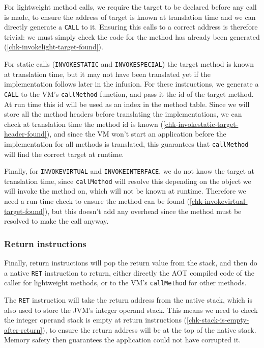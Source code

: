 For lightweight method calls, we require the target to be declared before any call is made, to ensure the address of target is known at translation time and we can directly generate a \texttt{CALL} to it. Ensuring this calls to a correct address is therefore trivial: we must simply check the code for the method has already been generated (\ref{chk-invokelight-target-found}).

For static calls (\texttt{INVOKESTATIC} and \texttt{INVOKESPECIAL}) the target method is known at translation time, but it may not have been translated yet if the implementation follows later in the infusion. For these instructions, we generate a \texttt{CALL} to the VM's \texttt{callMethod} function, and pass it the id of the target method. At run time this id will be used as an index in the method table. Since we will store all the method headers before translating the implementations, we can check at translation time the method id is known (\ref{chk-invokestatic-target-header-found}), and since the VM won't start an application before the implementation for all methods is translated, this guarantees that \texttt{callMethod} will find the correct target at runtime.

Finally, for \texttt{INVOKEVIRTUAL} and \texttt{INVOKEINTERFACE}, we do not know the target at translation time, since \texttt{callMethod} will resolve this depending on the object we will invoke the method on, which will not be known at runtime. Therefore we need a run-time check to ensure the method can be found (\ref{chk-invokevirtual-target-found}), but this doesn't add any overhead since the method must be resolved to make the call anyway.

\subsubsection{Return instructions}
Finally, return instructions will pop the return value from the stack, and then do a native \texttt{RET} instruction to return, either directly the AOT compiled code of the caller for lightweight methods, or to the VM's \texttt{callMethod} for other methods.

The \texttt{RET} instruction will take the return address from the native stack, which is also used to store the JVM's integer operand stack. This means we need to check the integer operand stack is empty at return instructions (\ref{chk-stack-is-empty-after-return}), to ensure the return address will be at the top of the native stack. Memory safety then guarantees the application could not have corrupted it.

